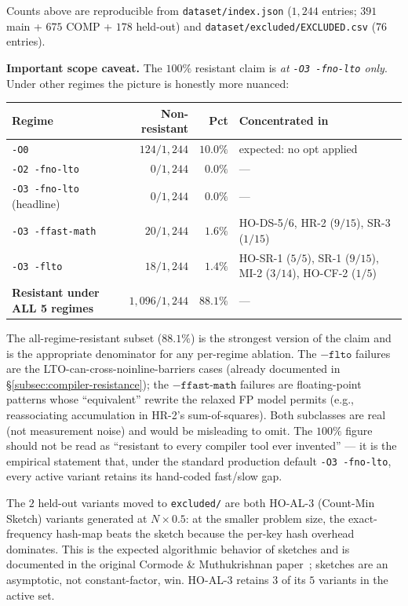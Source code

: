 Counts above are reproducible from \texttt{dataset/index.json} ($1{,}244$ entries; $391$ main + $675$ COMP + $178$ held-out) and \texttt{dataset/excluded/EXCLUDED.csv} ($76$ entries).

\textbf{Important scope caveat.} The $100\%$ resistant claim is \emph{at \texttt{-O3 -fno-lto} only}. Under other regimes the picture is honestly more nuanced:

\begin{center}
\begin{tabular}{lrrl}
\toprule
\textbf{Regime} & \textbf{Non-resistant} & \textbf{Pct} & \textbf{Concentrated in} \\
\midrule
\texttt{-O0}                        & $124/1{,}244$ & $10.0\%$ & expected: no opt applied \\
\texttt{-O2 -fno-lto}               & $0/1{,}244$   & $0.0\%$  & --- \\
\texttt{-O3 -fno-lto} (headline)    & $0/1{,}244$   & $0.0\%$  & --- \\
\texttt{-O3 -ffast-math}            & $20/1{,}244$  & $1.6\%$  & HO-DS-5/6, HR-2 ($9/15$), SR-3 ($1/15$) \\
\texttt{-O3 -flto}                  & $18/1{,}244$  & $1.4\%$  & HO-SR-1 ($5/5$), SR-1 ($9/15$), MI-2 ($3/14$), HO-CF-2 ($1/5$) \\
\midrule
\textbf{Resistant under ALL 5 regimes} & $1{,}096 / 1{,}244$ & $\mathbf{88.1\%}$ & --- \\
\bottomrule
\end{tabular}
\end{center}

The all-regime-resistant subset ($88.1\%$) is the strongest version of the claim and is the appropriate denominator for any per-regime ablation. The $-\texttt{flto}$ failures are the LTO-can-cross-noinline-barriers cases (already documented in \S\ref{subsec:compiler-resistance}); the $-\texttt{ffast-math}$ failures are floating-point patterns whose ``equivalent'' rewrite the relaxed FP model permits (e.g., reassociating accumulation in HR-2's sum-of-squares). Both subclasses are real (not measurement noise) and would be misleading to omit. The $100\%$ figure should not be read as ``resistant to every compiler tool ever invented'' --- it is the empirical statement that, under the standard production default \texttt{-O3 -fno-lto}, every active variant retains its hand-coded fast/slow gap.

The $2$ held-out variants moved to \texttt{excluded/} are both HO-AL-3 (Count-Min Sketch) variants generated at $N \times 0.5$: at the smaller problem size, the exact-frequency hash-map beats the sketch because the per-key hash overhead dominates. This is the expected algorithmic behavior of sketches and is documented in the original Cormode \& Muthukrishnan paper~\cite{cormode2005cms}; sketches are an asymptotic, not constant-factor, win. HO-AL-3 retains $3$ of its $5$ variants in the active set.

